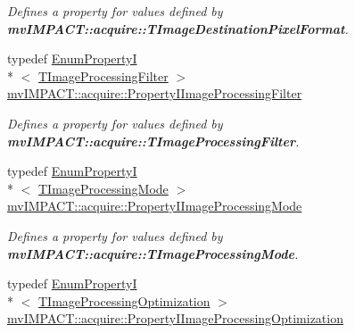 \begin{DoxyCompactItemize}
\begin{DoxyCompactList}\small\item\em Defines a property for values defined by {\bfseries mv\+I\+M\+P\+A\+C\+T\+::acquire\+::\+T\+Image\+Destination\+Pixel\+Format}. \end{DoxyCompactList}\item 
\hypertarget{group___common_interface_ga32f5b5edac93671f54854b4a76f0057e}{typedef \hyperlink{classmv_i_m_p_a_c_t_1_1acquire_1_1_enum_property_i}{Enum\+Property\+I}\\*
$<$ \hyperlink{group___common_interface_ga78ae15c334c800044e1b7042975fc829}{T\+Image\+Processing\+Filter} $>$ \hyperlink{group___common_interface_ga32f5b5edac93671f54854b4a76f0057e}{mv\+I\+M\+P\+A\+C\+T\+::acquire\+::\+Property\+I\+Image\+Processing\+Filter}}\label{group___common_interface_ga32f5b5edac93671f54854b4a76f0057e}

\begin{DoxyCompactList}\small\item\em Defines a property for values defined by {\bfseries mv\+I\+M\+P\+A\+C\+T\+::acquire\+::\+T\+Image\+Processing\+Filter}. \end{DoxyCompactList}\item 
\hypertarget{group___common_interface_ga12e3e1568fb58b1cb24383af267c53f7}{typedef \hyperlink{classmv_i_m_p_a_c_t_1_1acquire_1_1_enum_property_i}{Enum\+Property\+I}\\*
$<$ \hyperlink{group___common_interface_gaee0074fce284fcdf9ead4ad607e85a06}{T\+Image\+Processing\+Mode} $>$ \hyperlink{group___common_interface_ga12e3e1568fb58b1cb24383af267c53f7}{mv\+I\+M\+P\+A\+C\+T\+::acquire\+::\+Property\+I\+Image\+Processing\+Mode}}\label{group___common_interface_ga12e3e1568fb58b1cb24383af267c53f7}

\begin{DoxyCompactList}\small\item\em Defines a property for values defined by {\bfseries mv\+I\+M\+P\+A\+C\+T\+::acquire\+::\+T\+Image\+Processing\+Mode}. \end{DoxyCompactList}\item 
\hypertarget{group___common_interface_gad70153dd4d03d0db8f97382da8ae2d05}{typedef \hyperlink{classmv_i_m_p_a_c_t_1_1acquire_1_1_enum_property_i}{Enum\+Property\+I}\\*
$<$ \hyperlink{group___common_interface_ga9f8538d596e064d7854f355679357965}{T\+Image\+Processing\+Optimization} $>$ \hyperlink{group___common_interface_gad70153dd4d03d0db8f97382da8ae2d05}{mv\+I\+M\+P\+A\+C\+T\+::acquire\+::\+Property\+I\+Image\+Processing\+Optimization}}\label{group___common_interface_gad70153dd4d03d0db8f97382da8ae2d05}


\end{DoxyCompactItemize}
